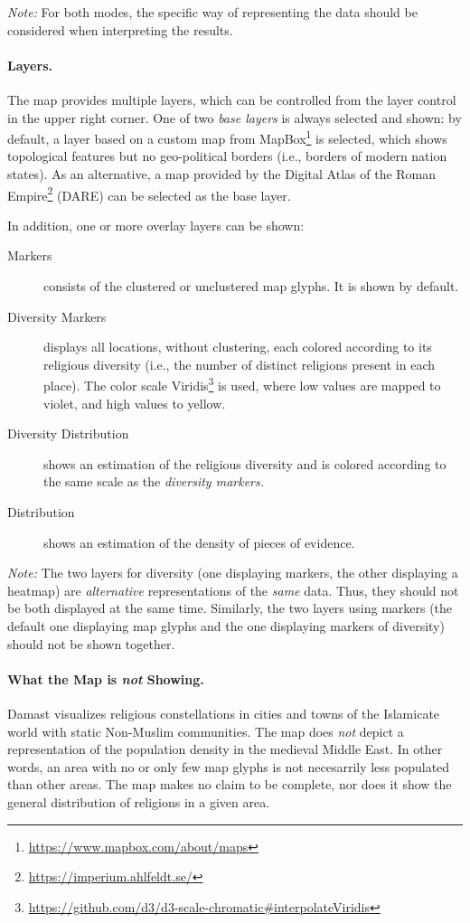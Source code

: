 \emph{Note:} For both modes, the specific way of representing the data should be considered when interpreting the results.


\paragraph{Layers.}
The map provides multiple layers, which can be controlled from the layer control in the upper right corner.
One of two \emph{base layers} is always selected and shown:
by default, a layer based on a custom map from MapBox\footnote{\url{https://www.mapbox.com/about/maps}} is selected, which shows topological features but no geo-political borders (i.e., borders of modern nation states).
As an alternative, a map provided by the Digital Atlas of the Roman Empire\footnote{\url{https://imperium.ahlfeldt.se/}} (DARE) can be selected as the base layer.

In addition, one or more overlay layers can be shown:

\begin{description}
  \item[Markers]
    consists of the clustered or unclustered map glyphs. It is shown by default.
  \item[Diversity Markers]
    displays all locations, without clustering, each colored according to its religious diversity (i.e., the number of distinct religions present in each place). The color scale Viridis\footnote{\url{https://github.com/d3/d3-scale-chromatic\#interpolateViridis}} is used, where low values are mapped to violet, and high values to yellow.
  \item[Diversity Distribution]
    shows an estimation of the religious diversity and is colored according to the same scale as the \emph{diversity markers.}
  \item[Distribution]
    shows an estimation of the density of pieces of evidence.
\end{description}

\emph{Note:} The two layers for diversity (one displaying markers, the other displaying a heatmap) are \emph{alternative} representations of the \emph{same} data.
Thus, they should not be both displayed at the same time.
Similarly, the two layers using markers (the default one displaying map glyphs and the one displaying markers of diversity) should not be shown together.


\paragraph{What the Map is \emph{not} Showing.}
Damast visualizes religious constellations in cities and towns of the Islamicate world with static Non-Muslim communities.
The map does \emph{not} depict a representation of the population density in the medieval Middle East.
In other words, an area with no or only few map glyphs is not necesarrily less populated than other areas.
The map makes no claim to be complete, nor does it show the general distribution of religions in a given area.

